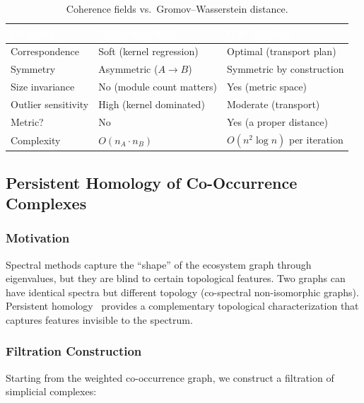 \documentclass{../yalumba}
\begin{document}
\begin{table}[H]
  \centering
  \tablestyle
  \caption{Coherence fields vs.\ Gromov--Wasserstein distance.}
  \label{tab:gw_comparison}
  \begin{tabular}{lll}
    \toprule
    \rowcolor{table-header}
    \textcolor{white}{\textbf{Property}} &
    \textcolor{white}{\textbf{Coherence field}} &
    \textcolor{white}{\textbf{GW distance}} \\
    \midrule
    Correspondence & Soft (kernel regression) & Optimal (transport plan) \\
    Symmetry & Asymmetric ($A \to B$) & Symmetric by construction \\
    Size invariance & No (module count matters) & Yes (metric space) \\
    Outlier sensitivity & High (kernel dominated) & Moderate (transport) \\
    Metric? & No & Yes (a proper distance) \\
    Complexity & $O(n_A \cdot n_B)$ & $O(n^2 \log n)$ per iteration \\
    \bottomrule
  \end{tabular}
\end{table}

\subsection{Persistent Homology of Co-Occurrence Complexes}
\label{sec:directions:ph}

\subsubsection{Motivation}

Spectral methods capture the ``shape'' of the ecosystem graph through
eigenvalues, but they are blind to certain topological features.  Two
graphs can have identical spectra but different topology (co-spectral
non-isomorphic graphs).  Persistent
homology~\cite{edelsbrunner2010computational} provides a complementary
topological characterization that captures features invisible to the
spectrum.

\subsubsection{Filtration Construction}

Starting from the weighted co-occurrence graph, we construct a
filtration of simplicial complexes:
\end{document}
